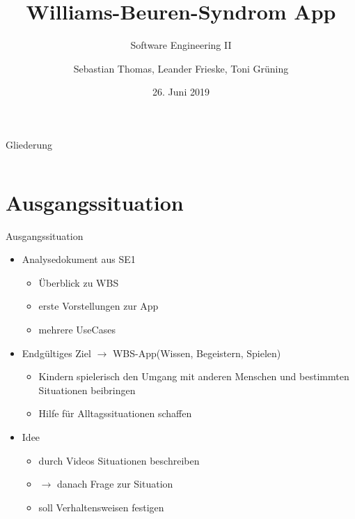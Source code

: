 \documentclass[10pt,fleqn]{beamer}
\title[WBS]{Williams-Beuren-Syndrom App}
\subtitle[]{Software Engineering II}
\date{26. Juni 2019}
\author{Sebastian Thomas, Leander Frieske, Toni Grüning}
\begin{document}

\begin{frame}
	\titlepage
\end{frame}

\begin{frame}{Gliederung}
 	\begin{columns}
   		\begin{column}{10.0cm}
		    \renewcommand{\baselinestretch}{1.5}
		    \normalsize
		    \tableofcontents
		    \renewcommand{\baselinestretch}{1.0}
		    \normalsize
	   	\end{column}
	   	\hspace*{-1.3cm}
	\end{columns}
\end{frame}


\section{Ausgangssituation}
\begin{frame}[t]{Ausgangssituation}
	\begin{itemize}
		\item Analysedokument aus SE1
		\begin{itemize}
			\item Überblick zu WBS
			\item erste Vorstellungen zur App
			\item mehrere UseCases
		\end{itemize}
	\item Endgültiges Ziel $\rightarrow$ WBS-App(Wissen, Begeistern, Spielen)
		\begin{itemize}
			\item Kindern spielerisch den Umgang mit anderen Menschen und bestimmten Situationen beibringen
			\item Hilfe für Alltagssituationen schaffen
		\end{itemize}
	\item Idee
		\begin{itemize}
			\item durch Videos Situationen beschreiben
			\item[] $\rightarrow$ danach Frage zur Situation
			\item soll Verhaltensweisen festigen
		\end{itemize}
	\end{itemize}
\end{frame}
\end{document}
